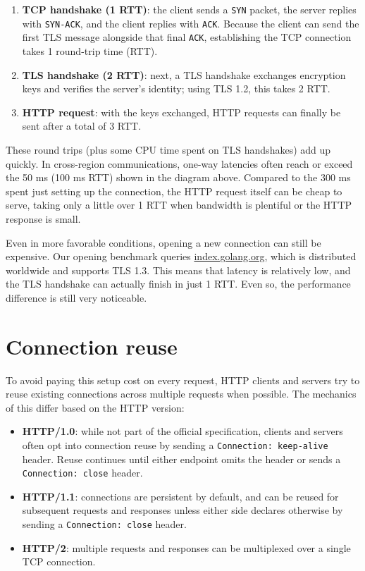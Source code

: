 \documentclass[11pt,a4paper]{article}
\begin{document}
\begin{enumerate}
\item \textbf{TCP handshake (1 RTT)}: the client sends a \texttt{SYN} packet, the server replies with \texttt{SYN-ACK}, and the client replies with \texttt{ACK}. Because the client can send the first TLS message alongside that final \texttt{ACK}, establishing the TCP connection takes 1 round-trip time (RTT).
\item \textbf{TLS handshake (2 RTT)}: next, a TLS handshake exchanges encryption keys and verifies the server's identity; using TLS 1.2, this takes 2 RTT.
\item \textbf{HTTP request}: with the keys exchanged, HTTP requests can finally be sent after a total of 3 RTT.
\end{enumerate}

These round trips (plus some CPU time spent on TLS handshakes) add up quickly. In cross-region communications, one-way latencies often reach or exceed the 50 ms (100 ms RTT) shown in the diagram above. Compared to the 300 ms spent just setting up the connection, the HTTP request itself can be cheap to serve, taking only a little over 1 RTT when bandwidth is plentiful or the HTTP response is small.

Even in more favorable conditions, opening a new connection can still be expensive. Our opening benchmark queries \href{https://index.golang.org/}{index.golang.org}, which is distributed worldwide and supports TLS 1.3. This means that latency is relatively low, and the TLS handshake can actually finish in just 1 RTT. Even so, the performance difference is still very noticeable.

\section{Connection reuse}

To avoid paying this setup cost on every request, HTTP clients and servers try to reuse existing connections across multiple requests when possible. The mechanics of this differ based on the HTTP version:

\begin{itemize}
\item \textbf{HTTP/1.0}: while not part of the official specification, clients and servers often opt into connection reuse by sending a \texttt{Connection: keep-alive} header. Reuse continues until either endpoint omits the header or sends a \texttt{Connection: close} header.
\item \textbf{HTTP/1.1}: connections are persistent by default, and can be reused for subsequent requests and responses unless either side declares otherwise by sending a \texttt{Connection: close} header.
\item \textbf{HTTP/2}: multiple requests and responses can be multiplexed over a single TCP connection.
\end{itemize}
\end{document}
